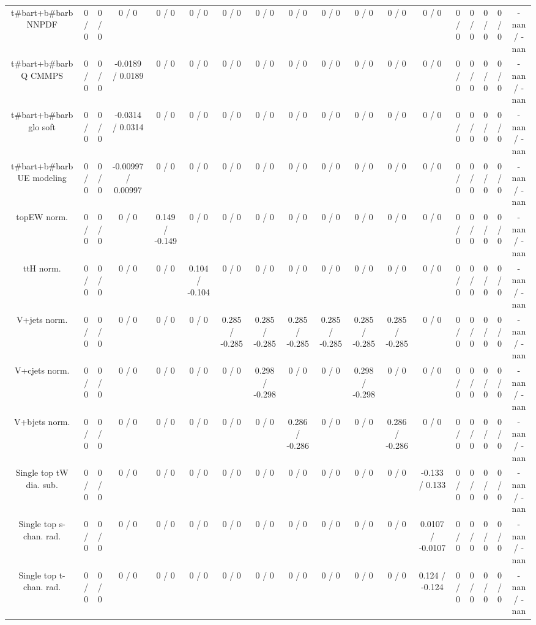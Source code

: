 \documentclass[10pt]{article}
\begin{document}
\begin{table}[htbp]
\begin{center}
\begin{tabular}{|c|c|c|c|c|c|c|c|c|c|c|c|c|c|c|c|c|c|}
  t#bar{t}+b#bar{b} NNPDF & 0 / 0 & 0 / 0 & 0 / 0 & 0 / 0 & 0 / 0 & 0 / 0 & 0 / 0 & 0 / 0 & 0 / 0 & 0 / 0 & 0 / 0 & 0 / 0 & 0 / 0 & 0 / 0 & 0 / 0 & 0 / 0 & -nan / -nan \\ 
  t#bar{t}+b#bar{b} Q CMMPS & 0 / 0 & 0 / 0 & -0.0189 / 0.0189 & 0 / 0 & 0 / 0 & 0 / 0 & 0 / 0 & 0 / 0 & 0 / 0 & 0 / 0 & 0 / 0 & 0 / 0 & 0 / 0 & 0 / 0 & 0 / 0 & 0 / 0 & -nan / -nan \\ 
  t#bar{t}+b#bar{b} glo soft & 0 / 0 & 0 / 0 & -0.0314 / 0.0314 & 0 / 0 & 0 / 0 & 0 / 0 & 0 / 0 & 0 / 0 & 0 / 0 & 0 / 0 & 0 / 0 & 0 / 0 & 0 / 0 & 0 / 0 & 0 / 0 & 0 / 0 & -nan / -nan \\ 
  t#bar{t}+b#bar{b} UE modeling & 0 / 0 & 0 / 0 & -0.00997 / 0.00997 & 0 / 0 & 0 / 0 & 0 / 0 & 0 / 0 & 0 / 0 & 0 / 0 & 0 / 0 & 0 / 0 & 0 / 0 & 0 / 0 & 0 / 0 & 0 / 0 & 0 / 0 & -nan / -nan \\ 
  topEW norm. & 0 / 0 & 0 / 0 & 0 / 0 & 0.149 / -0.149 & 0 / 0 & 0 / 0 & 0 / 0 & 0 / 0 & 0 / 0 & 0 / 0 & 0 / 0 & 0 / 0 & 0 / 0 & 0 / 0 & 0 / 0 & 0 / 0 & -nan / -nan \\ 
  ttH norm. & 0 / 0 & 0 / 0 & 0 / 0 & 0 / 0 & 0.104 / -0.104 & 0 / 0 & 0 / 0 & 0 / 0 & 0 / 0 & 0 / 0 & 0 / 0 & 0 / 0 & 0 / 0 & 0 / 0 & 0 / 0 & 0 / 0 & -nan / -nan \\ 
  V+jets norm. & 0 / 0 & 0 / 0 & 0 / 0 & 0 / 0 & 0 / 0 & 0.285 / -0.285 & 0.285 / -0.285 & 0.285 / -0.285 & 0.285 / -0.285 & 0.285 / -0.285 & 0.285 / -0.285 & 0 / 0 & 0 / 0 & 0 / 0 & 0 / 0 & 0 / 0 & -nan / -nan \\ 
  V+cjets norm. & 0 / 0 & 0 / 0 & 0 / 0 & 0 / 0 & 0 / 0 & 0 / 0 & 0.298 / -0.298 & 0 / 0 & 0 / 0 & 0.298 / -0.298 & 0 / 0 & 0 / 0 & 0 / 0 & 0 / 0 & 0 / 0 & 0 / 0 & -nan / -nan \\ 
  V+bjets norm. & 0 / 0 & 0 / 0 & 0 / 0 & 0 / 0 & 0 / 0 & 0 / 0 & 0 / 0 & 0.286 / -0.286 & 0 / 0 & 0 / 0 & 0.286 / -0.286 & 0 / 0 & 0 / 0 & 0 / 0 & 0 / 0 & 0 / 0 & -nan / -nan \\ 
  Single top tW dia. sub. & 0 / 0 & 0 / 0 & 0 / 0 & 0 / 0 & 0 / 0 & 0 / 0 & 0 / 0 & 0 / 0 & 0 / 0 & 0 / 0 & 0 / 0 & -0.133 / 0.133 & 0 / 0 & 0 / 0 & 0 / 0 & 0 / 0 & -nan / -nan \\ 
  Single top s-chan. rad. & 0 / 0 & 0 / 0 & 0 / 0 & 0 / 0 & 0 / 0 & 0 / 0 & 0 / 0 & 0 / 0 & 0 / 0 & 0 / 0 & 0 / 0 & 0.0107 / -0.0107 & 0 / 0 & 0 / 0 & 0 / 0 & 0 / 0 & -nan / -nan \\ 
  Single top t-chan. rad. & 0 / 0 & 0 / 0 & 0 / 0 & 0 / 0 & 0 / 0 & 0 / 0 & 0 / 0 & 0 / 0 & 0 / 0 & 0 / 0 & 0 / 0 & 0.124 / -0.124 & 0 / 0 & 0 / 0 & 0 / 0 & 0 / 0 & -nan / -nan \\ 

\end{tabular}
\end{center}
\end{table}
\end{document}
